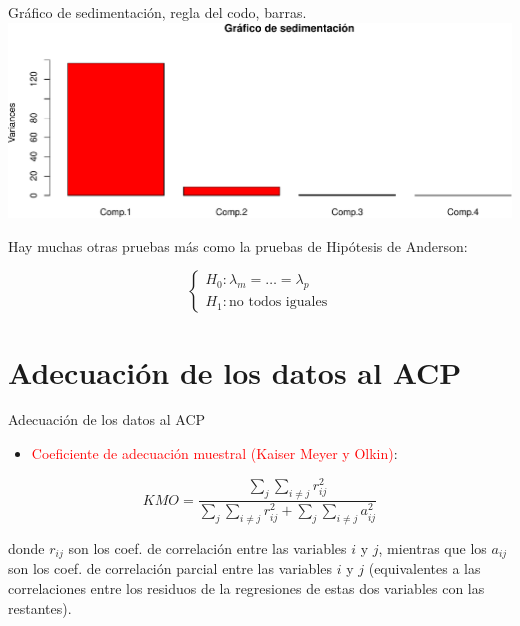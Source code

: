 \documentclass[
  ignorenonframetext,
]{beamer}
\providecommand{\tightlist}{%
  \setlength{\itemsep}{0pt}\setlength{\parskip}{0pt}}
\newcommand\red[1]{\textcolor{red}{#1}}
\begin{document}
\begin{frame}{Gráfico de sedimentación, regla del codo, barras.}
\protect\hypertarget{gruxe1fico-de-sedimentaciuxf3n-regla-del-codo-barras.}{}
\includegraphics{AnalisisComponentesPrincipales_fusion_files/figure-beamer/screeplotbar-1.pdf}

Hay muchas otras pruebas más como la pruebas de Hipótesis de Anderson:

\[\left\{ \begin{array}{l}
H_0: \lambda_m=\ldots=\lambda_p\\ H_1: \mbox{no todos
iguales}\end{array}\right.\]
\end{frame}

\hypertarget{adecuaciuxf3n-de-los-datos-al-acp}{%
\section{Adecuación de los datos al
ACP}\label{adecuaciuxf3n-de-los-datos-al-acp}}

\begin{frame}{Adecuación de los datos al ACP}
\protect\hypertarget{adecuaciuxf3n-de-los-datos-al-acp-1}{}
\begin{itemize}
\tightlist
\item
  \red{Coeficiente de adecuación muestral (Kaiser Meyer y Olkin)}:
\end{itemize}

\[KMO=\frac{\sum_j \sum_{i\not =j} r_{i j}^2}{\sum_j \sum_{i\not =j} r^2_{i j}+
\sum_j \sum_{i\not =j} a^2_{i j}}\]

donde \(r_{i j}\) son los coef. de correlación entre las variables \(i\)
y \(j\), mientras que los \(a_{i j}\) son los coef. de correlación
parcial entre las variables \(i\) y \(j\) (equivalentes a las
correlaciones entre los residuos de la regresiones de estas dos
variables con las restantes).
\end{frame}
\end{document}
